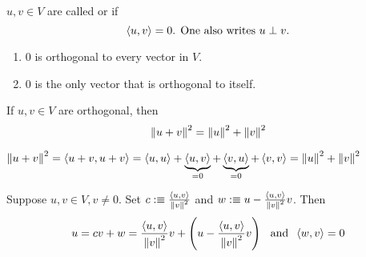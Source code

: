 \setcounter{thm}{9}
\begin{mydef}[orthogonal]
  $u,v \in V$ are called  or  if 
  \begin{equation}
    \ip{u}{v} =0$. One also writes $u \perp v.
  \end{equation}
\end{mydef}

\begin{thm}  
  \phantom{.} 
  \begin{enumerate}[label=(\alph*)]
    \item $0$ is orthogonal to every vector in $V$.
    \item $0$ is the only vector that is orthogonal to itself.
  \end{enumerate}
\end{thm}

\begin{thm}
  If $u,v \in V$ are orthogonal, then
  \begin{equation}
    \left \lVert u+v \right \rVert^2 = \left \lVert u \right \rVert^2 + \left \lVert v \right \rVert^2
  \end{equation}
\end{thm}
\begin{prf} 
  $\left \lVert u+v \right \rVert^2 = \left \langle u+v, u+v \right \rangle = \left \langle u, u \right \rangle + \underbrace{\left \langle u, v \right \rangle}_{=0} + \underbrace{\left \langle v, u \right \rangle}_{=0} + \left \langle v, v \right \rangle = \left \lVert u \right \rVert^2 + \left \lVert v \right \rVert^2 $
\end{prf}

\setcounter{thm}{12}
\begin{thm}
  \label{thm: an orthogonal decomposition}
  Suppose $u,v \in V, v\neq 0.$ Set $c :\equiv \frac{\left \langle u, v \right \rangle}{\left \lVert v \right \rVert^2}$ and $w :\equiv u-\frac{\left \langle u, v \right \rangle}{\left \lVert v \right \rVert^2}v$. Then
  \begin{equation}
    u = cv+w = \frac{\left \langle u, v \right \rangle}{\left \lVert v \right \rVert^2} v + \left( u- \frac{\left \langle u, v \right \rangle}{\left \lVert v \right \rVert^2} v \right  ) \;\;\, \text{and}\;\; \left \langle w, v \right \rangle=0
  \end{equation}
\end{thm}

